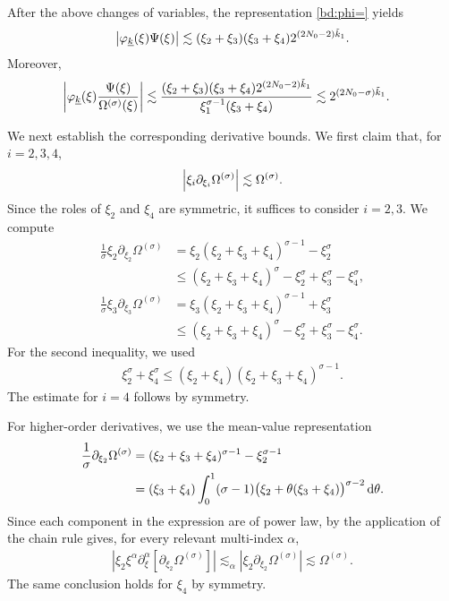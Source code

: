 \documentclass[UTF-8,reqno]{amsart}
\numberwithin{equation}{section}
\theoremstyle{definition}
\def\dif{{\mathord{{\rm d}}}}
\def\leq{\leqslant}
\def\dif{{\mathord{{\rm d}}}}
\def\leq{\leqslant}
\begin{document}
After the above changes of variables, the representation
\eqref{bd:phi=} yields
\begin{align}
\left|
\varphi_{\underline k}(\xi)\Psi(\xi)
\right|
\lesssim
(\xi_2+\xi_3)(\xi_3+\xi_4)
2^{(2N_0-2)\tilde k_1}.\notag
\end{align}  Moreover,
\begin{align}
\left|
\varphi_{\underline{k}}(\xi)
\frac{\Psi(\xi)}{\Omega^{(\sigma)}(\xi)}
\right|
&\lesssim
\frac{
(\xi_2+\xi_3)(\xi_3+\xi_4)
2^{(2N_0-2)\tilde{k}_1}
}{
\xi_1^{\sigma-1}(\xi_3+\xi_4)
}  \lesssim
2^{(2N_0-\sigma)\tilde{k}_1}.\notag
\end{align} 

We next establish the corresponding derivative bounds. We first claim
that, for $i=2,3,4$,
\begin{align}
    \left|
    \xi_i\partial_{\xi_i}\Omega^{(\sigma)}
    \right|
    \lesssim
    \Omega^{(\sigma)}.\notag
\end{align}
Since the roles of $\xi_2$ and $\xi_4$ are symmetric, it suffices to
consider $i=2,3$. We compute
\begin{align*}
\frac1\sigma
\xi_2\partial_{\xi_2}\Omega^{(\sigma)}
&=
\xi_2(\xi_2+\xi_3+\xi_4)^{\sigma-1}
-\xi_2^\sigma
\\
&\leq
(\xi_2+\xi_3+\xi_4)^\sigma
-\xi_2^\sigma+\xi_3^\sigma-\xi_4^\sigma,
\\
\frac1\sigma
\xi_3\partial_{\xi_3}\Omega^{(\sigma)}
&=
\xi_3(\xi_2+\xi_3+\xi_4)^{\sigma-1}
+\xi_3^\sigma
\\
&\leq
(\xi_2+\xi_3+\xi_4)^\sigma
-\xi_2^\sigma+\xi_3^\sigma-\xi_4^\sigma.
\end{align*}
For the second inequality, we used
\begin{align*}
    \xi_2^\sigma+\xi_4^\sigma
    \leq
    (\xi_2+\xi_4)
    (\xi_2+\xi_3+\xi_4)^{\sigma-1}.
\end{align*} 
The estimate for $i=4$ follows by symmetry.

For higher-order derivatives, we use the mean-value representation
\begin{align}
\frac1\sigma
\partial_{\xi_2}\Omega^{(\sigma)}
&=
(\xi_2+\xi_3+\xi_4)^{\sigma-1}
-\xi_2^{\sigma-1}
\notag\\
&=
(\xi_3+\xi_4)
\int_0^1
(\sigma-1)
\bigl(
\xi_2+\theta(\xi_3+\xi_4)
\bigr)^{\sigma-2}
\,\dif\theta.\notag
\end{align}
Since each component in the expression are of power law,  by the application of the chain rule gives, for every relevant
multi-index $\alpha$,
\begin{align}
\left|
\xi_2\xi^\alpha
\partial_\xi^\alpha
\left[
\partial_{\xi_2}\Omega^{(\sigma)}
\right]
\right|
\lesssim_\alpha
\left|
\xi_2\partial_{\xi_2}\Omega^{(\sigma)}
\right|
\lesssim
\Omega^{(\sigma)}.
\label{eq:higher-derivative-xi2-case22}
\end{align}
The same conclusion holds for $\xi_4$ by symmetry.
\end{document}
